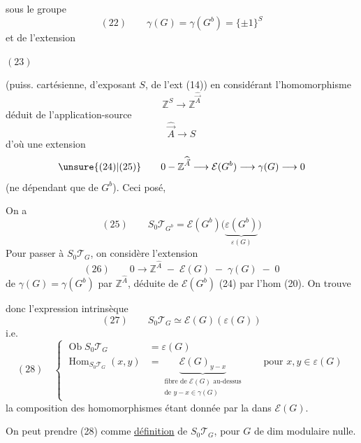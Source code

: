 sous le groupe
\[
(22)\qquad\gamma(G)=\gamma(G^b)=\{\pm1\}^S
\]
et de l'extension

$(23)$\quad
{}

(puiss. cartésienne, d'exposant $S$, de l'ext (14))
en considérant l'homomorphisme
\[
\mathbb Z^S\longrightarrow\mathbb Z^{\widehat{\vec A}}
\]
déduit de l'application-source
\[
\widehat{\vec A}\longrightarrow S
\]
d'où une extension
\[
\unsure{(24)|(25)}\qquad0-\mathbb Z^{\widehat{\vec A}}\longrightarrow\mathcal E(G^b)\longrightarrow\gamma(G)\longrightarrow0
\]
(ne dépendant que de $G^b$). Ceci posé,

On a
\[
(25)\qquad S_0\mathcal T_{G^b}=\mathcal E(G^b)\bigl(\underbrace{\varepsilon(G^b)}_{\varepsilon(G)}\bigr)
\]
Pour passer à $S_0\mathcal T_G$, on considère l'extension
\[
(26)\qquad0\longrightarrow\mathbb Z^{\widehat A}\;-\;\mathcal E(G)\;-\;\gamma(G)\;-\;0
\]
de $\gamma(G)=\gamma(G^b)$ par $\mathbb Z^{\widehat A}$, déduite de $\mathcal E(G^b)$ (24) par l'hom (20). On trouve

donc l'expression intrinsèque
\[
(27)\qquad S_0\mathcal T_G\simeq\mathcal E(G)(\varepsilon(G))
\]
i.e.
\[
(28)\quad\left\{
\begin{aligned}
\operatorname{Ob}S_0\mathcal T_G&=\varepsilon(G)\\
\operatorname{Hom}_{S_0\mathcal T_G}(x,y)&=
\underbrace{\mathcal E(G)_{y-x}}_{\substack{\text{fibre de }\mathcal E(G)\text{ au-dessus}\\\text{de }y-x\in\gamma(G)}}
\qquad\text{pour }x,y\in\varepsilon(G)
\end{aligned}\right.
\]
la composition des homomorphismes étant donnée par la  dans $\mathcal E(G)$.

On peut prendre (28) comme \uline{définition} de $S_0\mathcal T_G$, pour $G$ de dim modulaire nulle.


